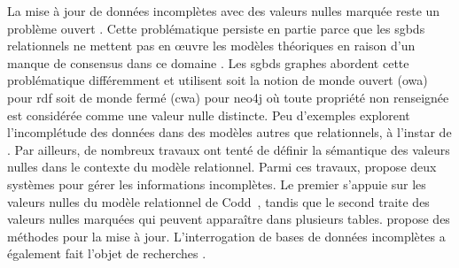 La mise à jour de données incomplètes avec des valeurs nulles marquée reste un problème ouvert \cite{libkinIncompleteDataWhat2014,consoleCopingIncompleteData2020}.
Cette problématique persiste en partie parce que les \glspl{sgbd} relationnels ne mettent pas en œuvre les modèles théoriques en raison d'un manque de consensus dans ce domaine \cite{zanioloDatabaseRelationsNull1984,faginSemanticsUpdatesDatabases1983,imielinskiIncompleteInformationRelational1984,abiteboulUpdateSemanticsIncomplete1985,reiterSoundSometimesComplete1986,faginUpdatingLogicalDatabases1986,winslettModelbasedApproachUpdating1988,grahneProblemIncompleteInformation1991,winslettUpdatingLogicalDatabases2004}.
Les \glspl{sgbd} graphes abordent cette problématique différemment et utilisent soit la notion de monde ouvert (\acs{owa}) pour \gls{rdf} soit de monde fermé (\acs{cwa}) pour \gls{neo4j} où toute propriété non renseignée est considérée comme une valeur nulle distincte.
Peu d'exemples explorent l'incomplétude des données dans des modèles autres que relationnels, à l'instar de \cite{sirangeloRepresentingQueryingIncomplete2014}.
Par ailleurs, de nombreux travaux ont tenté de définir la sémantique des valeurs nulles dans le contexte du modèle relationnel.
Parmi ces travaux, \cite{imielinskiIncompleteInformationRelational1984} propose deux systèmes pour gérer les informations incomplètes.
Le premier s'appuie sur les valeurs nulles du modèle relationnel de Codd~\cite{coddRelationalModelData1970}, tandis que le second traite des valeurs nulles marquées qui peuvent apparaître dans plusieurs tables.
\cite{degiacomoDealingInconsistenciesIncompleteness2009,degiacomoPracticalUpdateManagement2017,chabinConsistentUpdatingDatabases2020} propose des méthodes pour la mise à jour.
L'interrogation de bases de données incomplètes a également fait l'objet de recherches \cite{zanioloDatabaseRelationsNull1984,faginUpdatingLogicalDatabases1986,grahneProblemIncompleteInformation1991,bravoSemanticallyCorrectQuery2006,libkinSQLThreevaluedLogic2016,nikolaouQueryingIncompleteInformation2016,guagliardoCorrectnessSQLQueries2017}.

